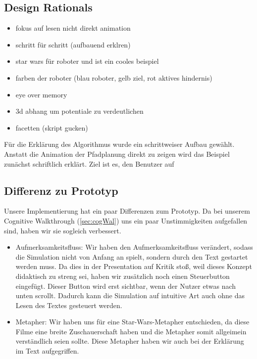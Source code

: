 \subsection{Design Rationals}
\begin{itemize}
\item fokus auf lesen nicht direkt animation
\item schritt für schritt (aufbauend erklren)
\item star wars für roboter und ist ein cooles beispiel
\item farben der roboter (blau roboter, gelb ziel, rot aktives hindernis)
\item eye over memory
\item 3d abhang um potentiale zu verdeutlichen
\item facetten (skript gucken)
\end{itemize}
Für die Erklärung des Algorithmus wurde ein schrittweiser Aufbau gewählt. Anstatt die Animation der Pfadplanung direkt zu zeigen wird das Beispiel zunächst schriftlich erklärt. Ziel ist es, den Benutzer auf 
\subsection{Differenz zu Prototyp}
Unsere Implementierung hat ein paar Differenzen zum Prototyp.
Da bei unserem Cognitive Walkthrough (\vref{sec:cogWal}) uns ein paar Unstimmigkeiten aufgefallen sind, haben wir sie sogleich verbessert.
\begin{itemize}
	\item Aufmerksamkeitsfluss: Wir haben den Aufmerksamkeitsfluss verändert, sodass die Simulation nicht von Anfang an spielt, sondern durch den Text gestartet werden muss. Da dies in der Presentation auf Kritik stoß, weil dieses Konzept didaktisch zu streng sei, haben wir zusätzlich noch einen Steuerbutton eingefügt. Dieser Button wird erst sichtbar, wenn der Nutzer etwas nach unten scrollt. Dadurch kann die Simulation auf intuitive Art auch ohne das Lesen des Textes gesteuert werden.
	\item Metapher: Wir haben uns für eine Star-Wars-Metapher entschieden, da diese Filme eine breite Zuschauerschaft haben und die Metapher somit allgeimein verständlich seien sollte. Diese Metapher haben wir auch bei der Erklärung im Text aufgegriffen.
\end{itemize}

